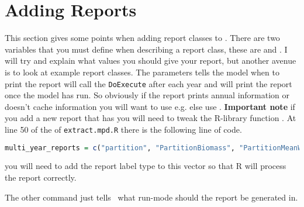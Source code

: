 \section{Adding Reports\label{sec:reports}}
This section gives some points when adding report classes to \CNAME. There are two variables that you must define when describing a report class, these are  and . I will try and explain what values you should give your report, but another avenue is to look at example report classes. The  parameters tells the model when to print the report  will call the \texttt{DoExecute} after each year and  will print the report once the model has run. So obviously if the report prints annual information or doesn't cache information you will want to use  e.g.  else use . \textbf{Important note} if you add a new report that has   you will need to tweak the R-library function . At line 50 of the of \texttt{extract.mpd.R} there is the following line of code.   

\begin{lstlisting}[language=R]
multi_year_reports = c("partition", "PartitionBiomass", "PartitionMeanWeight")
\end{lstlisting}

you will need to add the report label type to this vector so that R will process the report correctly.


The other command  just tells \CNAME\ what run-mode should the report be generated in.